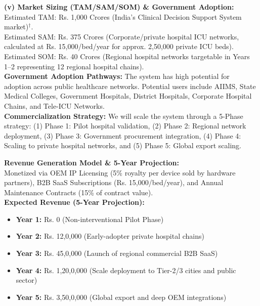\documentclass[11pt, a4paper]{article}
\begin{document}
\textbf{(v) Market Sizing (TAM/SAM/SOM) \& Government Adoption:}\\
Estimated TAM: Rs. 1,000 Crores (India's Clinical Decision Support System market)$^\dagger$.\\
Estimated SAM: Rs. 375 Crores (Corporate/private hospital ICU networks, calculated at Rs. 15,000/bed/year for approx. 2,50,000 private ICU beds).\\
Estimated SOM: Rs. 40 Crores (Regional hospital networks targetable in Years 1--2 representing 12 regional hospital chains).\\
\textbf{Government Adoption Pathways:} The system has high potential for adoption across public healthcare networks. Potential users include AIIMS, State Medical Colleges, Government Hospitals, District Hospitals, Corporate Hospital Chains, and Tele-ICU Networks.\\
\textbf{Commercialization Strategy:} We will scale the system through a 5-Phase strategy: (1) Phase 1: Pilot hospital validation, (2) Phase 2: Regional network deployment, (3) Phase 3: Government procurement integration, (4) Phase 4: Scaling to private hospital networks, and (5) Phase 5: Global export scaling.

\vspace{0.2cm}
\textbf{Revenue Generation Model \& 5-Year Projection:}\\
Monetized via OEM IP Licensing (5\% royalty per device sold by hardware partners), B2B SaaS Subscriptions (Rs. 15,000/bed/year), and Annual Maintenance Contracts (15\% of contract value).\\[0.1cm]
\textbf{Expected Revenue (5-Year Projection):}
\begin{itemize}
    \item \textbf{Year 1:} Rs. 0 (Non-interventional Pilot Phase)
    \item \textbf{Year 2:} Rs. 12,0,000 (Early-adopter private hospital chains)
    \item \textbf{Year 3:} Rs. 45,0,000 (Launch of regional commercial B2B SaaS)
    \item \textbf{Year 4:} Rs. 1,20,0,000 (Scale deployment to Tier-2/3 cities and public sector)
    \item \textbf{Year 5:} Rs. 3,50,0,000 (Global export and deep OEM integrations)
\end{itemize}
\end{document}
